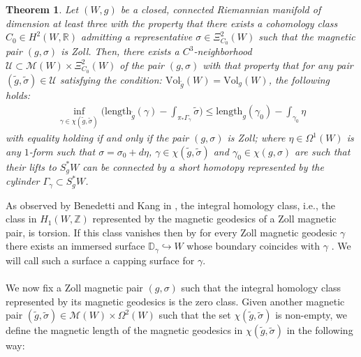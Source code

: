 \documentclass[11pt]{amsart}
\theoremstyle{plain}
\newtheorem{theorem}{Theorem}[section]
\theoremstyle{definition}
\theoremstyle{remark}
\begin{document}
\begin{theorem}\label{mag_sys_ineq_general}
Let $(W,g)$ be a closed, connected Riemannian manifold of dimension at least three with the property that there exists a cohomology class $C_0 \in H^2(W,\mathbb{R})$ admitting a representative $\sigma \in \Xi^2_{C_0}(W)$ such that the magnetic pair $(g,\sigma)$ is Zoll. Then, there exists a $C^3$-neighborhood $\mathcal{U} \subset \mathcal{M}(W) \times \Xi^2_{C_0}(W)$ of the pair $(g,\sigma)$ with that property that for any pair $(\tilde g,\tilde \sigma) \in \mathcal{U}$ satisfying the condition: $\text{Vol}_{\tilde g}(W) = \text{Vol}_{g}(W)$, the following holds:
\begin{align}\label{mag_sys_ineq_general_eqn}
\inf_{\gamma \in \chi(\tilde g,\tilde \sigma)}\Big(\text{length}_{\tilde g}(\gamma)-\int_{\pi_*\Gamma_{\gamma}} \tilde \sigma\Big) \leq \text{length}_{g}(\gamma_0) - \int_{\gamma_0}\eta
\end{align}
with equality holding if and only if the pair $(g,\sigma)$ is Zoll;
where $\eta \in \Omega^1(W)$ is any $1$-form such that $\sigma = \sigma_0+d\eta$, $\gamma \in \chi(\tilde g,\tilde \sigma)$ and $\gamma_0 \in \chi(g,\sigma)$ are such that their lifts to $S^*_gW$ can be connected by a short homotopy represented by the cylinder $\Gamma_{\gamma} \subset S^*_gW$.
\end{theorem}
As observed by Benedetti and Kang in \cite[Lemma 4.5]{B-K-Odd_Symp}, the integral homology class, i.e., the class in $H_1(W,\mathbb{Z})$ represented by the magnetic geodesics of a Zoll magnetic pair, is torsion. If this class vanishes then by for every Zoll magnetic geodesic $\gamma$ there exists an immersed surface $\mathbb{D}_{\gamma} \hookrightarrow W$ whose boundary coincides with $\gamma$ \cite[Proposition 3.4.8]{Geiges_book}. We will call such a surface a capping surface for $\gamma$.\\
\\
We now fix a Zoll magnetic pair $(g,\sigma)$ such that the integral homology class represented by its magnetic geodesics is the zero class. Given another magnetic pair $(\tilde g,\tilde \sigma) \in \mathcal{M}(W)\times \Omega^2(W)$ such that the set $\chi(\tilde g,\tilde \sigma)$ is non-empty, we define the magnetic length of the magnetic geodesics in $\chi(\tilde g,\tilde \sigma)$ in the following way:
\end{document}
